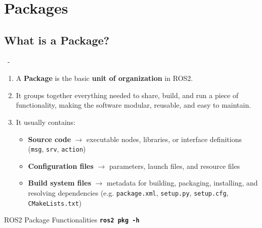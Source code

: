 \documentclass{beamer}
\begin{document}
\section{Packages}

\subsection{What is a Package?}
\begin{frame}{\insertsection \ - \insertsubsection}
    \begin{enumerate}
        \item A \textbf{Package} is the basic \textbf{unit of organization} in ROS2.
        \item It groups together everything needed to share, build, and run a piece of functionality, making the software modular, reusable, and easy to maintain.
        \item It usually contains:
        \begin{itemize}
            \item \textbf{Source code} $\rightarrow$ executable nodes, libraries, or interface definitions (\texttt{msg}, \texttt{srv}, \texttt{action})
            \item \textbf{Configuration files} $\rightarrow$ parameters, launch files, and resource files
            \item \textbf{Build system files} $\rightarrow$ metadata for building, packaging, installing, and resolving dependencies 
                  (e.g. \texttt{package.xml}, \texttt{setup.py}, \texttt{setup.cfg}, \texttt{CMakeLists.txt})
        \end{itemize}
    \end{enumerate}
    \begin{block}{ROS2 Package Functionalities}
        \large \textbf{\texttt{ros2 pkg -h}}
    \end{block}
\end{frame}
\end{document}
